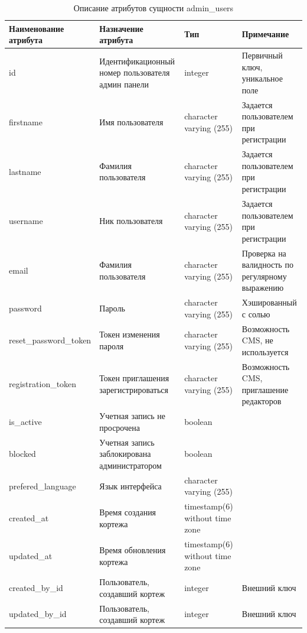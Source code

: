 \documentclass{mirea}
\begin{document}
	\begin{longtable}{ |p{}|p{}|p{}|p{}| } 
		\caption{Описание атрибутов сущности admin\_users}
		\endfirsthead
		\endhead
		\hline
		Наименование атрибута & Назначение атрибута & Тип & Примечание \\ \hline
		
		id & Идентификацион\-ный номер пользователя админ панели & integer & Первичный ключ, уникальное поле \\ \hline
		
		firstname & Имя пользователя & character varying (255) & Задается пользователем при регистрации \\ \hline
		
		lastname & Фамилия пользователя & character varying (255) & Задается пользователем при регистрации \\ \hline
		
		username & Ник пользователя & character varying (255) & Задается пользователем при регистрации \\ \hline
		
		email & Фамилия пользователя & character varying (255) & Проверка на валидность по регулярному выражению \\ \hline
		
		password & Пароль & character varying (255) & Хэшированный с солью \\ \hline
		
		reset\_password\_token & Токен изменения пароля & character varying (255) & Возможность CMS, не используется \\ \hline
		
		registration\_token & Токен приглашения зарегистрироваться & character varying (255) & Возможность CMS, приглашение редакторов \\ \hline
		
		is\_active & Учетная запись не просрочена & boolean & \\ \hline
		
		blocked & Учетная запись заблокирована администратором & boolean & \\ \hline
		
		prefered\_language & Язык интерфейса & character varying (255) & \\ \hline
		
		created\_at & Время создания кортежа & timestamp(6) without time zone & \\ \hline
		
		updated\_at & Время обновления кортежа & timestamp(6) without time zone & \\ \hline
		
		created\_by\_id & Пользователь, создавший кортеж & integer & Внешний ключ \\ \hline
		
		updated\_by\_id & Пользователь, создавший кортеж & integer & Внешний ключ \\ \hline
		
	\end{longtable}
\end{document}
